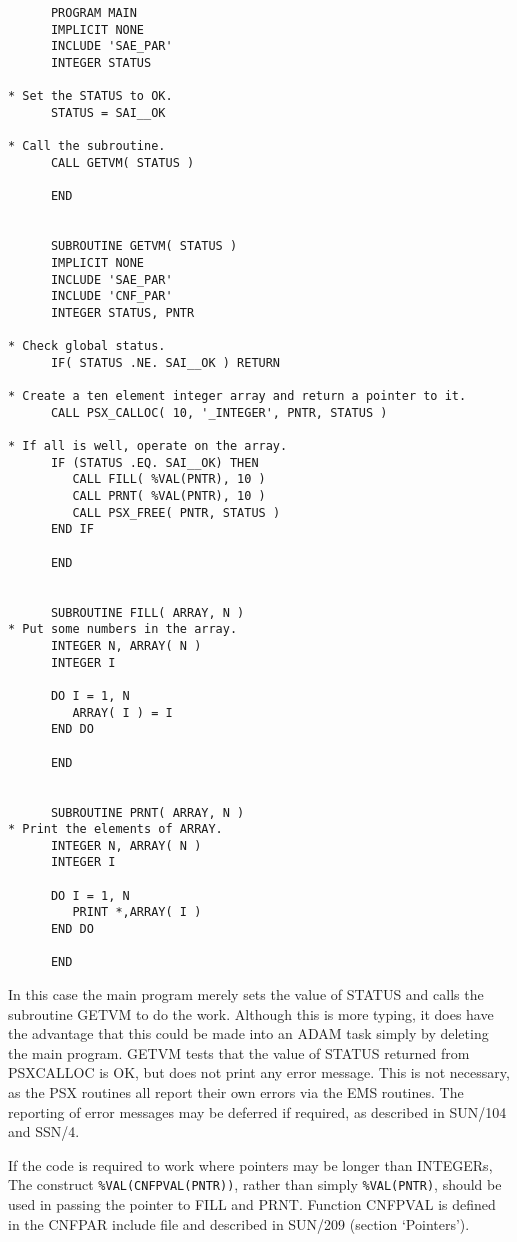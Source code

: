 \documentclass[twoside,11pt]{article}
\newcommand{\latex}[1]{#1}
\newcommand{\xref}[3]{#1}
\renewcommand{\_}{\texttt{\symbol{95}}}
\begin{document}
\begin{small}
\begin{verbatim}
      PROGRAM MAIN
      IMPLICIT NONE
      INCLUDE 'SAE_PAR'
      INTEGER STATUS

* Set the STATUS to OK.
      STATUS = SAI__OK

* Call the subroutine.
      CALL GETVM( STATUS )

      END


      SUBROUTINE GETVM( STATUS )
      IMPLICIT NONE
      INCLUDE 'SAE_PAR'
      INCLUDE 'CNF_PAR'
      INTEGER STATUS, PNTR

* Check global status.
      IF( STATUS .NE. SAI__OK ) RETURN

* Create a ten element integer array and return a pointer to it.
      CALL PSX_CALLOC( 10, '_INTEGER', PNTR, STATUS )

* If all is well, operate on the array.
      IF (STATUS .EQ. SAI__OK) THEN
         CALL FILL( %VAL(PNTR), 10 )
         CALL PRNT( %VAL(PNTR), 10 )
         CALL PSX_FREE( PNTR, STATUS )
      END IF

      END


      SUBROUTINE FILL( ARRAY, N )
* Put some numbers in the array.
      INTEGER N, ARRAY( N )
      INTEGER I

      DO I = 1, N
         ARRAY( I ) = I
      END DO

      END


      SUBROUTINE PRNT( ARRAY, N )
* Print the elements of ARRAY.
      INTEGER N, ARRAY( N )
      INTEGER I

      DO I = 1, N
         PRINT *,ARRAY( I )
      END DO

      END
\end{verbatim}
\end{small}

In this case the main program merely sets the value of STATUS and calls
the subroutine GETVM to do the work. Although this is more typing, it
does have the advantage that this could be made into an ADAM task
simply by deleting the main program. GETVM tests that the value of
STATUS returned from PSX\_CALLOC is OK, but does not print any error
message. This is not necessary, as the PSX routines all report their
own errors via the EMS routines. The reporting of error messages may be
deferred if required, as described in \xref{SUN/104}{sun104}{} and
\xref{SSN/4}{ssn4}{}.

If the code is required to work where pointers may be longer than INTEGERs,
The construct \texttt{\%VAL(CNF\_PVAL(PNTR))}, rather than simply 
\texttt{\%VAL(PNTR)}, should be used in passing the pointer to FILL and PRNT.
Function CNF\_PVAL is defined in the CNF\_PAR include file and described in 
\xref{SUN/209}{sun209}{accessing_dynamic_memory_from_c_and_fortran}\latex{
(section `Pointers')}.
\end{document}
